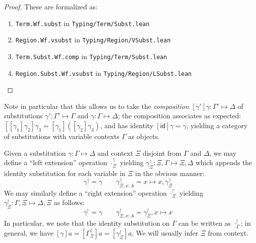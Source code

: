 \documentclass[acmsmall,screen,review]{acmart}
\newcommand{\ms}[1]{\ensuremath{\mathsf{#1}}}
\newcommand{\rupg}[1]{{#1}^\upharpoonright}
\newcommand{\lupg}[1]{{#1}^\upharpoonleft}
\newcommand{\bhyp}[2]{#1 : #2}
\newcommand{\issubst}[3]{#1: #2 \mapsto #3}
\begin{document}
\begin{proof}
  These are formalized as:
  \begin{enumerate}[label=(\alph*)]
    \item \texttt{Term.Wf.subst} in \texttt{Typing/Term/Subst.lean}
    \item \texttt{Region.Wf.vsubst} in \texttt{Typing/Region/VSubst.lean}
    \item \texttt{Term.Subst.Wf.comp} in \texttt{Typing/Term/Subst.lean}
    \item \texttt{Region.Subst.Wf.vsubst} in \texttt{Typing/Region/LSubst.lean}
  \end{enumerate}
\end{proof}
Note in particular that this allows us to take the \emph{composition}
$\issubst{[\gamma']\gamma}{\Gamma'}{\Delta}$ of substitutions $\issubst{\gamma'}{\Gamma'}{\Gamma}$
and $\issubst{\gamma}{\Gamma}{\Delta}$; the composition associates as expected:
$[[\gamma_1]\gamma_2]\gamma_3 = [\gamma_1]([\gamma_2]\gamma_3)$, and has identity $[\ms{id}]\gamma =
\gamma$, yielding a category of substitutions with variable contexts $\Gamma$ as objects.

Given a substitution $\issubst{\gamma}{\Gamma}{\Delta}$ and context $\Xi$ disjoint from $\Gamma$ and
$\Delta$, we may define a ``left extension'' operation $\lupg{\cdot}_\Xi$ yielding
$\issubst{\lupg{\gamma}_{\Xi}}{\Xi, \Gamma}{\Xi, \Delta}$ which appends the identity substitution
for each variable in $\Xi$ in the obvious manner:
\begin{equation}
  \lupg{\gamma}_{\cdot} = \gamma \qquad 
  \lupg{\gamma}_{\Xi, \bhyp{x}{A}} = x \mapsto x, \lupg{\gamma}_{\Xi}
\end{equation}
We may similarly define a ``right extension'' operation $\rupg{\cdot}_\Xi$ yielding
$\issubst{\rupg{\gamma}_{\Xi}}{\Gamma, \Xi}{\Delta, \Xi}$ as follows:
\begin{equation}
  \rupg{\gamma}_{\cdot} = \gamma \qquad 
  \rupg{\gamma}_{\Xi, \bhyp{x}{A}} = \rupg{\gamma}_{\Xi}, x \mapsto x
\end{equation}
In particular, we note that the identity substitution on $\Gamma$ can be written as
$\rupg{\cdot}_{\Gamma}$; in general, we have $[\gamma]a = [\lupg{\Gamma}_\Xi]a =
[\rupg{\gamma}_\Xi]a$. We will usually infer $\Xi$ from context.
\end{document}

